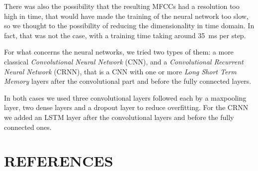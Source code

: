 \documentclass{article}
\begin{document}
There was also the possibility that the resulting MFCCs had a resolution too high in time, that would have made the training of the neural network too slow, so we thought to the possibility of reducing the dimensionality in time domain. In fact, that was not the case, with a training time taking around \SI{35}{\milli\second} per step. 

For what concerns the neural networks, we tried two types of them: a more classical \emph{Convolutional Neural Network} (CNN), and a \emph{Convolutional Recurrent Neural Network} (CRNN), that is a CNN with one or more \emph{Long Short Term Memory} layers after the convolutional part and before the fully connected layers.

In both cases we used three convolutional layers followed each by a maxpooling layer, two dense layers and a dropout layer to reduce overfitting. For the CRNN we added an LSTM layer after the convolutional layers and before the fully connected ones.

\section{REFERENCES}
\label{sec:refs}


%
%
\end{document}
